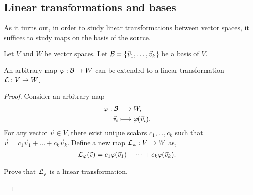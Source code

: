 \subsection{Linear transformations and bases}
\label{section:linearTransformationsBases}
As it turns out, in order to study linear transformations between vector spaces, it suffices to study maps on the basis of the source.

%
%


Let $V$ and $W$ be vector spaces.
Let $\mathcal{B} = \{ \vec{v}_1 , \dots, \vec{v}_k \}$ be a basis of $V$.


\begin{proposition}
  An arbitrary map $\varphi: \mathcal{B} \rightarrow W$ can be  extended to a linear transformation $\mathcal{L}: V \rightarrow W$.
\end{proposition}
\begin{proof}
  Consider an arbitrary map \begin{align*}
    \varphi: \mathcal{B} &\longrightarrow W, \\
    \vec{v}_i &\longmapsto \varphi(\vec{v}_i).
  \end{align*}
      For any vector $\vec{v} \in V$, there exist unique scalars $c_1, \dots, c_k$ such that
      $\vec{v} = c_1 \vec{v}_1 + \dots + c_k \vec{v}_k$.
      Define a new map $\mathcal{L}_\varphi: V \rightarrow W$ as, \begin{align*}
        \mathcal{L}_\varphi(\vec{v}) = c_1 \varphi(\vec{v}_1) + \dots + c_k \varphi(\vec{v}_k).
    \end{align*}
    \begin{qbox}
      Prove that $\mathcal{L}_\varphi$ is a linear transformation.
    \end{qbox}
\end{proof}

